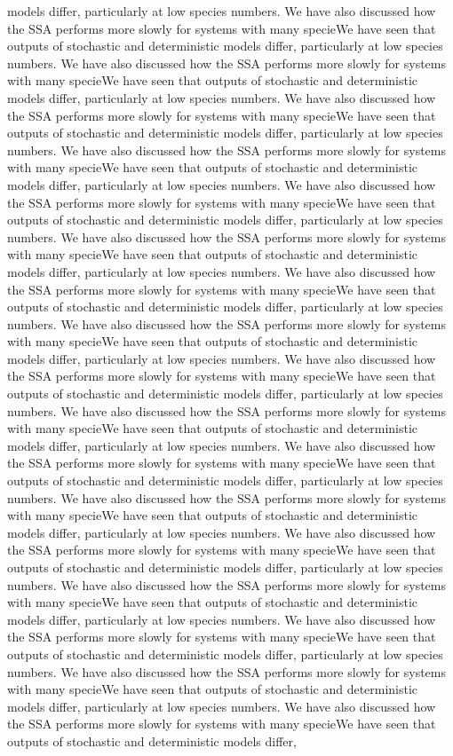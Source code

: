 \documentclass[11pt]{article}
\begin{document}
\begin{multicols}{2}
models differ, particularly at low species numbers. We have also discussed how the SSA performs more slowly for systems with many specieWe have seen that outputs of stochastic and deterministic models differ, particularly at low species numbers. We have also discussed how the SSA performs more slowly for systems with many specieWe have seen that outputs of stochastic and deterministic models differ, particularly at low species numbers. We have also discussed how the SSA performs more slowly for systems with many specieWe have seen that outputs of stochastic and deterministic models differ, particularly at low species numbers. We have also discussed how the SSA performs more slowly for systems with many specieWe have seen that outputs of stochastic and deterministic models differ, particularly at low species numbers. We have also discussed how the SSA performs more slowly for systems with many specieWe have seen that outputs of stochastic and deterministic models differ, particularly at low species numbers. We have also discussed how the SSA performs more slowly for systems with many specieWe have seen that outputs of stochastic and deterministic models differ, particularly at low species numbers. We have also discussed how the SSA performs more slowly for systems with many specieWe have seen that outputs of stochastic and deterministic models differ, particularly at low species numbers. We have also discussed how the SSA performs more slowly for systems with many specieWe have seen that outputs of stochastic and deterministic models differ, particularly at low species numbers. We have also discussed how the SSA performs more slowly for systems with many specieWe have seen that outputs of stochastic and deterministic models differ, particularly at low species numbers. We have also discussed how the SSA performs more slowly for systems with many specieWe have seen that outputs of stochastic and deterministic models differ, particularly at low species numbers. We have also discussed how the SSA performs more slowly for systems with many specieWe have seen that outputs of stochastic and deterministic models differ, particularly at low species numbers. We have also discussed how the SSA performs more slowly for systems with many specieWe have seen that outputs of stochastic and deterministic models differ, particularly at low species numbers. We have also discussed how the SSA performs more slowly for systems with many specieWe have seen that outputs of stochastic and deterministic models differ, particularly at low species numbers. We have also discussed how the SSA performs more slowly for systems with many specieWe have seen that outputs of stochastic and deterministic models differ, particularly at low species numbers. We have also discussed how the SSA performs more slowly for systems with many specieWe have seen that outputs of stochastic and deterministic models differ, particularly at low species numbers. We have also discussed how the SSA performs more slowly for systems with many specieWe have seen that outputs of stochastic and deterministic models differ, particularly at low species numbers. We have also discussed how the SSA performs more slowly for systems with many specieWe have seen that outputs of stochastic and deterministic models differ, 
\end{multicols}
\end{document}
